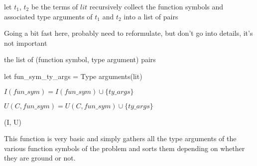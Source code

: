 \documentclass[]{ceurart}
\begin{document}
\begin{algorithm}[th]
\begin{algorithmic}[1]

   \State let \(t_1\), \(t_2\) be the terms of \(lit\)
   \State recursively collect the function symbols and associated type arguments of \(t_1\) and \(t_2\) into a list of pairs

   \State \Comment Going a bit fast here, probably need to reformulate, but don't go into details, it's not important

   \State \Return the list of (function symbol, type argument) pairs

\EndFunction
\end{algorithmic}
\end{algorithm}


\begin{algorithm}[tbh]
\begin{algorithmic}[1]
         \State let fun\_sym\_ty\_args = Type arguments(lit)

            \State \(I(fun\_sym) = I(fun\_sym) \cup \{ty\_args\}\)

         \Else

            \State \(U(C, fun\_sym) = U(C, fun\_sym) \cup \{ty\_args\}\)

         \EndIf
         \EndFor
      \EndFor
   \EndFor

   \State \Return (I, U)

\EndFunction
\end{algorithmic}
\end{algorithm}

This function is very basic and simply gathers all the type arguments of the various function symbols of the problem and sorts them depending on whether they are ground or not.
\end{document}
